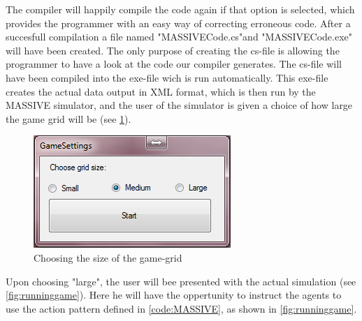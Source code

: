 The compiler will happily compile the code again if that option is selected, which provides the programmer with an easy way of correcting erroneous code. After a succesfull compilation a file named "MASSIVECode.cs"and "MASSIVECode.exe" will have been created. The only purpose of creating the cs-file is allowing the programmer to have a look at the code our compiler generates. The cs-file will have been compiled into the exe-file wich is run automatically. This exe-file creates the actual data output in XML format, which is then run by the MASSIVE simulator, and the user of the simulator is given a choice of how large the game grid will be (see \ref{fig:game_promt}).

\begin{figure}[h]%
\begin{center}
\includegraphics[width=\columnwidth]{images/massive_dialog.png}%
\caption{Choosing the size of the game-grid}%
\label{fig:game_promt}%
\end{center}
\end{figure}

Upon choosing "large", the user will bee presented with the actual simulation (see \ref{fig:runninggame}). Here he will have the oppertunity to instruct the agents to use the action pattern defined in \ref{code:MASSIVE}, as shown in \ref{fig:runninggame}.

